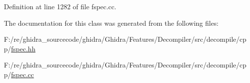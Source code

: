 Definition at line 1282 of file fspec.\+cc.



The documentation for this class was generated from the following files\+:\begin{DoxyCompactItemize}
\item 
F\+:/re/ghidra\+\_\+sourcecode/ghidra/\+Ghidra/\+Features/\+Decompiler/src/decompile/cpp/\mbox{\hyperlink{fspec_8hh}{fspec.\+hh}}\item 
F\+:/re/ghidra\+\_\+sourcecode/ghidra/\+Ghidra/\+Features/\+Decompiler/src/decompile/cpp/\mbox{\hyperlink{fspec_8cc}{fspec.\+cc}}\end{DoxyCompactItemize}
